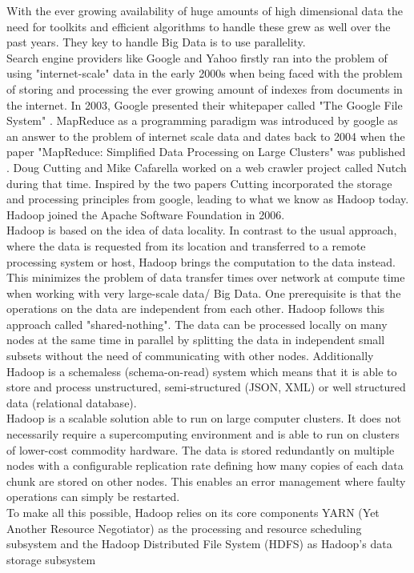With the ever growing availability of huge amounts of high dimensional data the need for toolkits and efficient algorithms to handle these grew as well over the past years. They key to handle Big Data is to use parallelity.\\
Search engine providers like Google and Yahoo firstly ran into the problem of using "internet-scale" data in the early 2000s when being faced with the problem of storing and processing the ever growing amount of indexes from documents in the internet. In 2003, Google presented their whitepaper called "The Google File System" \cite{gfs}. MapReduce as a programming paradigm was introduced by google as an answer to the problem of internet scale data and dates back to 2004 when the paper "MapReduce: Simplified Data Processing on Large Clusters" was published \cite{mapreduce1}. Doug Cutting and Mike Cafarella worked on a web crawler project called Nutch during that time. Inspired by the two papers Cutting incorporated the storage and processing principles from google, leading to what we know as Hadoop today. Hadoop joined the Apache Software Foundation in 2006. \cite[p. 6]{sparkbook1}\\ 
Hadoop is based on the idea of data locality. In contrast to the usual approach, where the data is requested from its location and transferred to a remote processing system or host, Hadoop brings the computation to the data instead. This minimizes the problem of data transfer times over network at compute time when working with very large-scale data/ Big Data. One prerequisite is that the operations on the data are independent from each other. Hadoop follows this approach called "shared-nothing". The data can be processed locally on many nodes at the same time in parallel by splitting the data in independent small subsets without the need of communicating with other nodes. Additionally Hadoop is a schemaless (schema-on-read) system which means that it is able to store and process unstructured, semi-structured (JSON, XML) or well structured data (relational database). \cite[p. 7]{sparkbook1}\\
Hadoop is a scalable solution able to run on large computer clusters. It does not necessarily require a supercomputing environment and is able to run on clusters of lower-cost commodity hardware. The data is stored redundantly on multiple nodes with a configurable replication rate defining how many copies of each data chunk are stored on other nodes. This enables an error management where faulty operations can simply be restarted.\\
To make all this possible, Hadoop relies on its core components YARN (Yet Another Resource Negotiator) as the processing and resource scheduling subsystem and the Hadoop Distributed File System (HDFS) as Hadoop's data storage subsystem\\

